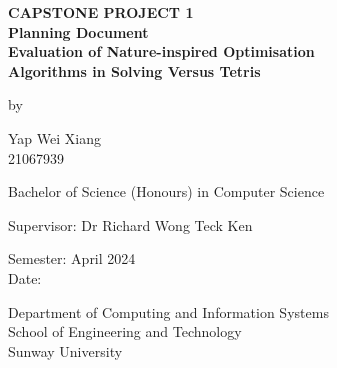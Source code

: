 \documentclass[a4paper, 12pt]{extreport}
\begin{document}
	\begin{titlepage}
		
		\centering
		
		\vspace{.5cm}
		
		\begin{center}
			\textbf{\large CAPSTONE PROJECT 1} \\
			\textbf{\large Planning Document} \\
			\vspace{1cm}
			\textbf{\large Evaluation of Nature-inspired Optimisation\\Algorithms in Solving Versus Tetris}
			
			\vspace{1cm}
			
			by
			
			\vspace{1cm}
			
			\large Yap Wei Xiang \\
			21067939
			
			\vspace{1cm}
			
			Bachelor of Science (Honours) in Computer Science
			
			\vspace{1cm}
			
			\large Supervisor: Dr Richard Wong Teck Ken
			
			\vspace{1cm}
			
			\normalsize Semester: April 2024 \\
			Date: %
			
			\vfill
			
			Department of Computing and Information Systems\\
			School of Engineering and Technology\\
			Sunway University
		\end{center}
		
	\end{titlepage}
	
\end{document}
